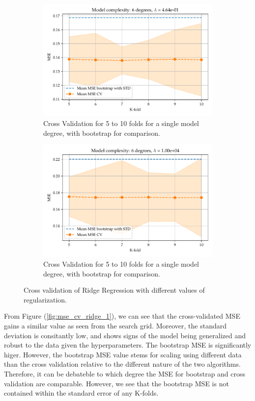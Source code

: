 \documentclass[11pt, a4paper]{article}
\begin{document}
\begin{figure}
\begin{subfigure}{0.49\textwidth}
    \includegraphics[width=\textwidth]{figures/EX4_mse_cv_boot26.pdf}
    \caption{\label{fig:mse_cv_ridge_3}Cross Validation for 5 to 10 folds for a single model degree, with bootstrap for comparison.}
  \end{subfigure}
  \hfill
  \begin{subfigure}{0.49\textwidth}
    \centering
    \includegraphics[width=\textwidth]{figures/EX4_mse_cv_boot36.pdf}
    \caption{\label{fig:mse_cv_ridge_4}Cross Validation for 5 to 10 folds for a single model degree, with bootstrap for comparison.}
  \end{subfigure}
  \caption{\label{sfig:ridge_cv_1}Cross validation of Ridge Regression with different values of regularization.}
\end{figure}


From Figure (\ref{fig:mse_cv_ridge_1}), we can see that the cross-validated MSE gains a similar value as seen from the search grid. Moreover, the standard deviation is consitantly low, and shows signs of the model being generalized and robust to the data given the hyperparameters. The bootstrap MSE is significantly higer. However, the bootstrap MSE value stems for scaling using different data than the cross validation relative to the different nature of the two algorithms. Therefore, it can be debateble to which degree the MSE for bootstrap and cross validation are comparable. However, we see that the bootstrap MSE is not contained within the standard error of any K-folds.
\end{document}
